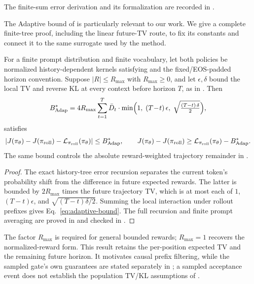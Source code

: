 The finite-sum error derivation and its formalization are recorded in
.

The Adaptive bound of \citet{li2025trm} is particularly relevant to our work.
We give a complete finite-tree proof, including the linear future-TV route,
to fix its constants and connect it to the same surrogate used by the method.

\begin{theorem}
\label{thm:adaptive-bound}
For a finite prompt distribution and finite vocabulary, let both policies be
normalized history-dependent kernels satisfying  and the
fixed/EOS-padded horizon convention. Suppose $|R|\le R_{\max}$ with
$R_{\max}\ge0$, and let $\epsilon,\delta$ bound the local TV and reverse KL
at every context before horizon $T$, as in . Then
\begin{equation}
    B_{\mathrm{Adap}}^{*} = 4 R_{\max} \sum_{t=1}^{T} \bar{D}_t \cdot \min\!\Big(1,\;(T\!-\!t)\,\epsilon,\;\sqrt{\tfrac{(T-t)\,\delta}{2}}\Big),
    \label{eq:adaptive-bound}
\end{equation}
satisfies
\begin{equation*}
    |J(\pi_{\theta})-J(\pi_{\mathrm{roll}})-\mathcal L_{\pi_{\mathrm{roll}}}(\pi_{\theta})|
    \le B_{\mathrm{Adap}}^{*},
    \qquad
    J(\pi_{\theta})-J(\pi_{\mathrm{roll}})
    \ge \mathcal L_{\pi_{\mathrm{roll}}}(\pi_{\theta})-B_{\mathrm{Adap}}^{*}.
\end{equation*}
The same bound controls the absolute reward-weighted trajectory remainder in
.
\end{theorem}

\begin{proof}
The exact history-tree error recursion separates the current token's
probability shift from the difference in future expected rewards.
The latter is bounded by $2R_{\max}$ times the future trajectory TV, which is
at most each of $1$, $(T-t)\epsilon$, and $\sqrt{(T-t)\delta/2}$.
Summing the local interaction under rollout prefixes gives
Eq.~\eqref{eq:adaptive-bound}. The full recursion and finite prompt averaging
are proved in  and checked in
.
\end{proof}

The factor $R_{\max}$ is required for general bounded rewards; $R_{\max}=1$
recovers the normalized-reward form. This result retains the per-position
expected TV and the remaining future horizon. It motivates causal prefix
filtering, while the sampled gate's own guarantees are stated separately in
; a sampled acceptance event does not establish
the population TV/KL assumptions of .

